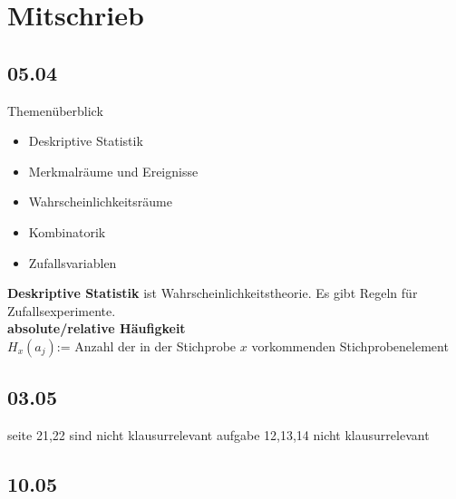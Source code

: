 \section{Mitschrieb}


\subsection{05.04}

Themenüberblick
\begin{itemize}
    \item Deskriptive Statistik
    \item Merkmalräume und Ereignisse
    \item Wahrscheinlichkeitsräume 
    \item Kombinatorik 
    \item Zufallsvariablen
\end{itemize}

\textbf{Deskriptive Statistik} ist Wahrscheinlichkeitstheorie. 
Es gibt Regeln für Zufallsexperimente. \\

\textbf{absolute/relative Häufigkeit}\\
$H_x(a_j)$:= Anzahl der in der Stichprobe $x$ vorkommenden Stichprobenelement

\subsection{03.05}
seite 21,22 sind nicht klausurrelevant
aufgabe 12,13,14 nicht klausurrelevant 

\subsection{10.05}

